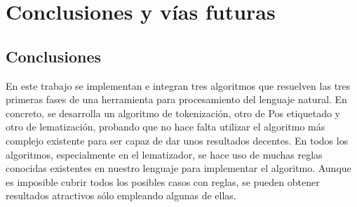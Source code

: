 \chapter{Conclusiones y vías futuras}
\label{conclusion}
\section{Conclusiones}
En este trabajo se implementan e integran tres algoritmos que resuelven las tres primeras fases de una herramienta
para procesamiento del lenguaje natural. En concreto, se desarrolla un algoritmo de tokenización, otro de Pos etiquetado y otro de lematización, probando que no hace falta utilizar el algoritmo más complejo existente para ser capaz de dar unos resultados decentes. En todos los algoritmos, especialmente en el lematizador, se hace uso de muchas reglas conocidas existentes en nuestro lenguaje para implementar el algoritmo. Aunque es imposible cubrir todos los posibles casos con reglas, se pueden obtener resultados atractivos sólo empleando algunas de ellas. 
